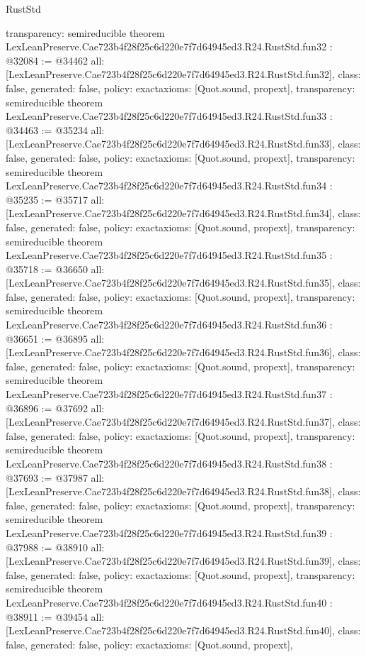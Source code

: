 \begin{lexlean}{RustStd}
\begin{coremodule}
{  transparency: semireducible
}
theorem LexLeanPreserve.Cae723b4f28f25c6d220e7f7d64945ed3.R24.RustStd.fun32 : @32084 := @34462 {
  all: [LexLeanPreserve.Cae723b4f28f25c6d220e7f7d64945ed3.R24.RustStd.fun32],
  class: false,
  generated: false,
  policy: exact{axioms: [Quot.sound, propext]},
  transparency: semireducible
}
theorem LexLeanPreserve.Cae723b4f28f25c6d220e7f7d64945ed3.R24.RustStd.fun33 : @34463 := @35234 {
  all: [LexLeanPreserve.Cae723b4f28f25c6d220e7f7d64945ed3.R24.RustStd.fun33],
  class: false,
  generated: false,
  policy: exact{axioms: [Quot.sound, propext]},
  transparency: semireducible
}
theorem LexLeanPreserve.Cae723b4f28f25c6d220e7f7d64945ed3.R24.RustStd.fun34 : @35235 := @35717 {
  all: [LexLeanPreserve.Cae723b4f28f25c6d220e7f7d64945ed3.R24.RustStd.fun34],
  class: false,
  generated: false,
  policy: exact{axioms: [Quot.sound, propext]},
  transparency: semireducible
}
theorem LexLeanPreserve.Cae723b4f28f25c6d220e7f7d64945ed3.R24.RustStd.fun35 : @35718 := @36650 {
  all: [LexLeanPreserve.Cae723b4f28f25c6d220e7f7d64945ed3.R24.RustStd.fun35],
  class: false,
  generated: false,
  policy: exact{axioms: [Quot.sound, propext]},
  transparency: semireducible
}
theorem LexLeanPreserve.Cae723b4f28f25c6d220e7f7d64945ed3.R24.RustStd.fun36 : @36651 := @36895 {
  all: [LexLeanPreserve.Cae723b4f28f25c6d220e7f7d64945ed3.R24.RustStd.fun36],
  class: false,
  generated: false,
  policy: exact{axioms: [Quot.sound, propext]},
  transparency: semireducible
}
theorem LexLeanPreserve.Cae723b4f28f25c6d220e7f7d64945ed3.R24.RustStd.fun37 : @36896 := @37692 {
  all: [LexLeanPreserve.Cae723b4f28f25c6d220e7f7d64945ed3.R24.RustStd.fun37],
  class: false,
  generated: false,
  policy: exact{axioms: [Quot.sound, propext]},
  transparency: semireducible
}
theorem LexLeanPreserve.Cae723b4f28f25c6d220e7f7d64945ed3.R24.RustStd.fun38 : @37693 := @37987 {
  all: [LexLeanPreserve.Cae723b4f28f25c6d220e7f7d64945ed3.R24.RustStd.fun38],
  class: false,
  generated: false,
  policy: exact{axioms: [Quot.sound, propext]},
  transparency: semireducible
}
theorem LexLeanPreserve.Cae723b4f28f25c6d220e7f7d64945ed3.R24.RustStd.fun39 : @37988 := @38910 {
  all: [LexLeanPreserve.Cae723b4f28f25c6d220e7f7d64945ed3.R24.RustStd.fun39],
  class: false,
  generated: false,
  policy: exact{axioms: [Quot.sound, propext]},
  transparency: semireducible
}
theorem LexLeanPreserve.Cae723b4f28f25c6d220e7f7d64945ed3.R24.RustStd.fun40 : @38911 := @39454 {
  all: [LexLeanPreserve.Cae723b4f28f25c6d220e7f7d64945ed3.R24.RustStd.fun40],
  class: false,
  generated: false,
  policy: exact{axioms: [Quot.sound, propext]},
}
\end{coremodule}
\end{lexlean}
